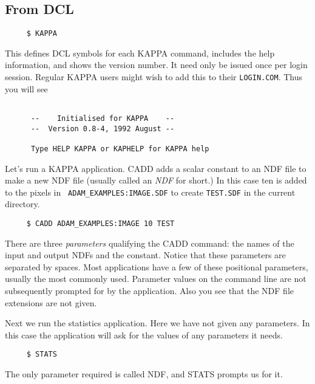 \subsection{From DCL}

\small
\begin{verbatim}
     $ KAPPA
\end{verbatim}
\normalsize

This defines {\small DCL} symbols for each {\small KAPPA} command,
includes the help information, and shows the version number. It need
only be issued once per login session.  Regular {\small KAPPA} users
might wish to add this to their {\tt LOGIN.COM}.  Thus you will see

\small
\begin{verbatim}

      --    Initialised for KAPPA    --
      --  Version 0.8-4, 1992 August --

      Type HELP KAPPA or KAPHELP for KAPPA help

\end{verbatim}
\normalsize

Let's run a {\small KAPPA} application.  CADD adds a scalar constant to
an NDF file to make a new NDF file (usually called an {\em NDF\/} for
short.)  In this case ten is added to the pixels in {\tt
ADAM\_EXAMPLES:IMAGE.SDF} to create {\tt TEST.SDF} in the current
directory. 

\small
\begin{verbatim}
     $ CADD ADAM_EXAMPLES:IMAGE 10 TEST
\end{verbatim}
\normalsize

There are three {\em parameters\/} qualifying the CADD command: the names
of the input and output NDFs and the constant.  Notice that these
parameters are separated by spaces.  Most applications have a few of
these positional parameters, usually the most commonly used. Parameter
values on the command line are not subsequently prompted for by the
application.  Also you see that the NDF file extensions are not given.

Next we run the statistics application.  Here we have not given
any parameters.  In this case the application will ask for the
values of any parameters it needs.

\small
\begin{verbatim}
     $ STATS
\end{verbatim}
\normalsize

The only parameter required is called NDF, and STATS prompts us for it.

